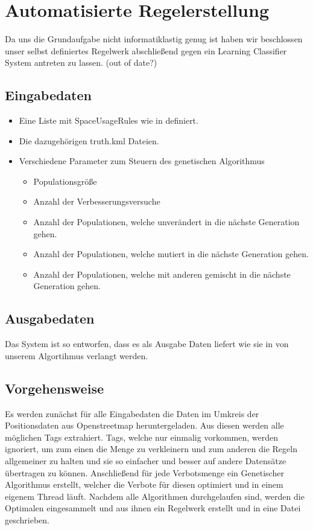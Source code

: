 \section{Automatisierte Regelerstellung}
Da uns die Grundaufgabe nicht informatiklastig genug ist
haben wir beschlossen unser selbst definiertes Regelwerk abschließend gegen ein Learning Classifier System antreten zu lassen. (out of date?)

\subsection{Eingabedaten}
\begin{itemize}
\item Eine Liste mit SpaceUsageRules wie in  definiert.
\item Die dazugehörigen truth.kml Dateien.
\item Verschiedene Parameter zum Steuern des genetischen Algorithmus
  \begin{itemize}
  \item Populationsgröße
  \item Anzahl der Verbesserungsversuche
  \item Anzahl der Populationen, welche unverändert in die nächste Generation gehen.
  \item Anzahl der Populationen, welche mutiert in die nächste Generation gehen.
  \item Anzahl der Populationen, welche mit anderen gemischt in die nächste Generation gehen.
  \end{itemize}
\end{itemize}

\subsection{Ausgabedaten}
Das System ist so entworfen, dass es als Ausgabe Daten liefert wie sie in  von unserem Algortihmus verlangt werden.

\subsection{Vorgehensweise}
Es werden zunächst für alle Eingabedaten die Daten im Umkreis der Positionsdaten aus Openstreetmap heruntergeladen.
Aus diesen werden alle möglichen Tags extrahiert. Tags, welche nur einmalig vorkommen, werden ignoriert, um zum einen die Menge zu verkleinern
und zum anderen die Regeln allgemeiner zu halten und sie so einfacher und besser auf andere Datensätze übertragen zu können.
Anschließend für jede Verbotsmenge ein Genetischer Algorithmus erstellt, welcher die Verbote für diesen optimiert und in einem eigenem Thread läuft.
Nachdem alle Algorithmen durchgelaufen sind, werden die Optimalen eingesammelt und aus ihnen ein Regelwerk erstellt und in eine Datei geschrieben.

